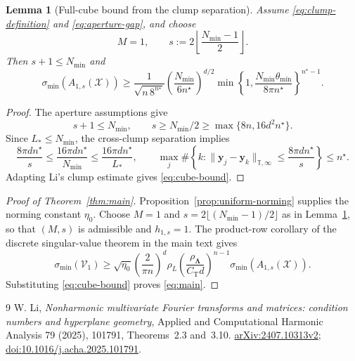 \documentclass[11pt]{article}
\newtheorem{lemma}{Lemma}
\newcommand{\V}{\mathcal V}
\newcommand{\X}{\mathcal X}
\newcommand{\T}{\mathbb T}
\begin{document}
\begin{lemma}[Full-cube bound from the clump separation]\label{lem:clump-fullcube}
Assume \eqref{eq:clump-definition} and \eqref{eq:aperture-gap}, and choose
\[
M=1,\qquad s:=2\left\lfloor\frac{N_{\min}-1}{2}\right\rfloor.
\]
Then $s+1\le N_{\min}$ and
\begin{equation}\label{eq:cube-bound}
\sigma_{\min}(A_{1,s}(\X))\ge\frac{1}{\sqrt{n\,8^{n^\star}}}\left(\frac{N_{\min}}{6n^\star}\right)^{d/2}\min\left\{1,\frac{N_{\min}\theta_{\min}}{8\pi n^\star}\right\}^{n^\star-1}.
\end{equation}
\end{lemma}
\begin{proof}
The aperture assumptions give
\[
s+1\le N_{\min},\qquad s\ge N_{\min}/2\ge\max\{8n,16d^2n^\star\}.
\]
Since $L_*\le N_{\min}$, the cross-clump separation implies
\[
\frac{8\pi dn^\star}{s}\le\frac{16\pi dn^\star}{N_{\min}}\le\frac{16\pi dn^\star}{L_*},\qquad \max_j\#\left\{k:\|\bm y_j-\bm y_k\|_{\T,\infty}\le\frac{8\pi dn^\star}{s}\right\}\le n^\star.
\]
Adapting Li's clump estimate \cite[Theorem~3.10]{Li} gives \eqref{eq:cube-bound}.
\end{proof}

\begin{proof}[Proof of Theorem~\ref{thm:main}]
Proposition~\ref{prop:uniform-norming} supplies the norming constant $\eta_0$. Choose $M=1$ and $s=2\lfloor(N_{\min}-1)/2\rfloor$ as in Lemma~\ref{lem:clump-fullcube}, so that $(M,s)$ is admissible and $h_{1,s}=1$. The product-row corollary of the discrete singular-value theorem in the main text gives
\begin{equation}\label{eq:product-bound}
\sigma_{\min}(\V_1)\ge\sqrt{\eta_0}\left(\frac2{\pi n}\right)^d\rho_L\left(\frac{\rho_{\bm\Lambda}}{C_{\mathrm T}d}\right)^{n-1}\sigma_{\min}(A_{1,s}(\X)).
\end{equation}
Substituting \eqref{eq:cube-bound} proves \eqref{eq:main}.
\end{proof}

\begin{thebibliography}{9}
 W. Li, \emph{Nonharmonic multivariate Fourier transforms and matrices: condition numbers and hyperplane geometry}, Applied and Computational Harmonic Analysis 79 (2025), 101791, Theorems~2.3 and~3.10. \href{https://arxiv.org/html/2407.10313v2}{arXiv:2407.10313v2}; \href{https://doi.org/10.1016/j.acha.2025.101791}{doi:10.1016/j.acha.2025.101791}.
\end{thebibliography}
\end{document}
